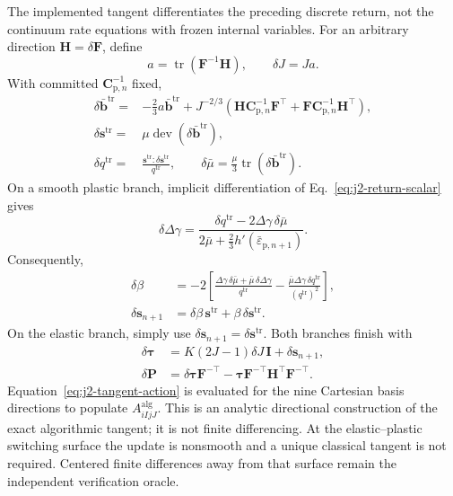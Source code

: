\documentclass[11pt,a4paper]{article}
\newcommand{\bs}[1]{\boldsymbol{#1}}
\newcommand{\tr}{\operatorname{tr}}
\newcommand{\dev}{\operatorname{dev}}
\newcommand{\I}{\bs{I}}
\newcommand{\F}{\bs{F}}
\newcommand{\Pstress}{\bs{P}}
\newcommand{\tauK}{\bs{\tau}}
\begin{document}
The implemented tangent differentiates the preceding discrete return, not the continuum rate equations with frozen internal variables.  For an arbitrary direction $\bs H=\delta\F$, define
\begin{equation}
a=\tr(\F^{-1}\bs H),
\qquad \delta J=Ja.
\end{equation}
With committed $\bs C_{\mathrm p,n}^{-1}$ fixed,
\begin{align}
\delta\bar{\bs b}^{\mathrm{tr}}
={}&-\frac23a\bar{\bs b}^{\mathrm{tr}}
+J^{-2/3}\left(
\bs H\bs C_{\mathrm p,n}^{-1}\F^\top
+\F\bs C_{\mathrm p,n}^{-1}\bs H^\top\right),\\
\delta\bs s^{\mathrm{tr}}
={}&\mu\dev(\delta\bar{\bs b}^{\mathrm{tr}}),\\
\delta q^{\mathrm{tr}}
={}&\frac{\bs s^{\mathrm{tr}}:\delta\bs s^{\mathrm{tr}}}{q^{\mathrm{tr}}},
\qquad
\delta\bar\mu=\frac{\mu}{3}\tr(\delta\bar{\bs b}^{\mathrm{tr}}).
\end{align}
On a smooth plastic branch, implicit differentiation of Eq.~\eqref{eq:j2-return-scalar} gives
\begin{equation}
\delta\Delta\gamma
=\frac{\delta q^{\mathrm{tr}}-2\Delta\gamma\,\delta\bar\mu}
{2\bar\mu+\frac23h'(\bar\varepsilon_{\mathrm p,n+1})}.
\end{equation}
Consequently,
\begin{align}
\delta\beta
&=-2\left[
\frac{\Delta\gamma\,\delta\bar\mu+\bar\mu\,\delta\Delta\gamma}{q^{\mathrm{tr}}}
-\frac{\bar\mu\Delta\gamma\,\delta q^{\mathrm{tr}}}{(q^{\mathrm{tr}})^2}
\right],\\
\delta\bs s_{n+1}
&=\delta\beta\,\bs s^{\mathrm{tr}}+\beta\,\delta\bs s^{\mathrm{tr}}.
\end{align}
On the elastic branch, simply use $\delta\bs s_{n+1}=\delta\bs s^{\mathrm{tr}}$.  Both branches finish with
\begin{align}
\delta\tauK
&=K(2J-1)\delta J\,\I+\delta\bs s_{n+1},\\
\delta\Pstress
&=\delta\tauK\F^{-\top}
-\tauK\F^{-\top}\bs H^\top\F^{-\top}.
\label{eq:j2-tangent-action}
\end{align}
Equation~\eqref{eq:j2-tangent-action} is evaluated for the nine Cartesian basis directions to populate $A^{\mathrm{alg}}_{iIjJ}$.  This is an analytic directional construction of the exact algorithmic tangent; it is not finite differencing.  At the elastic--plastic switching surface the update is nonsmooth and a unique classical tangent is not required.  Centered finite differences away from that surface remain the independent verification oracle.
\end{document}
